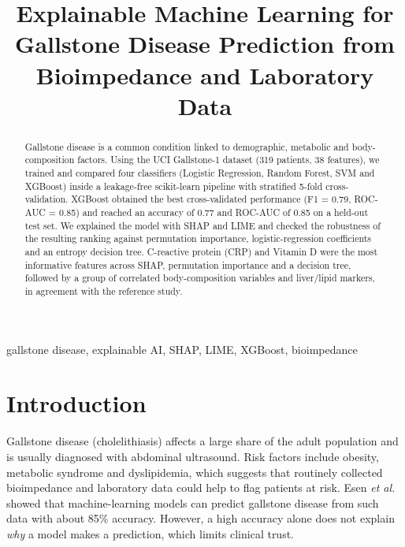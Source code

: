 \documentclass[conference]{IEEEtran}
\begin{document}
\title{Explainable Machine Learning for Gallstone Disease Prediction from Bioimpedance and Laboratory Data}

\author{
}

\maketitle

\begin{abstract}
Gallstone disease is a common condition linked to demographic, metabolic and body-composition factors. Using the UCI Gallstone-1 dataset (319 patients, 38 features), we trained and compared four classifiers (Logistic Regression, Random Forest, SVM and XGBoost) inside a leakage-free scikit-learn pipeline with stratified 5-fold cross-validation. XGBoost obtained the best cross-validated performance (F1 = 0.79, ROC-AUC = 0.85) and reached an accuracy of 0.77 and ROC-AUC of 0.85 on a held-out test set. We explained the model with SHAP and LIME and checked the robustness of the resulting ranking against permutation importance, logistic-regression coefficients and an entropy decision tree. C-reactive protein (CRP) and Vitamin D were the most informative features across SHAP, permutation importance and a decision tree, followed by a group of correlated body-composition variables and liver/lipid markers, in agreement with the reference study.
\end{abstract}

\begin{IEEEkeywords}
gallstone disease, explainable AI, SHAP, LIME, XGBoost, bioimpedance
\end{IEEEkeywords}

\section{Introduction}
Gallstone disease (cholelithiasis) affects a large share of the adult population and is usually diagnosed with abdominal ultrasound. Risk factors include obesity, metabolic syndrome and dyslipidemia, which suggests that routinely collected bioimpedance and laboratory data could help to flag patients at risk. Esen \textit{et al.}~\cite{esen2024} showed that machine-learning models can predict gallstone disease from such data with about 85\% accuracy. However, a high accuracy alone does not explain \emph{why} a model makes a prediction, which limits clinical trust.
\end{document}
